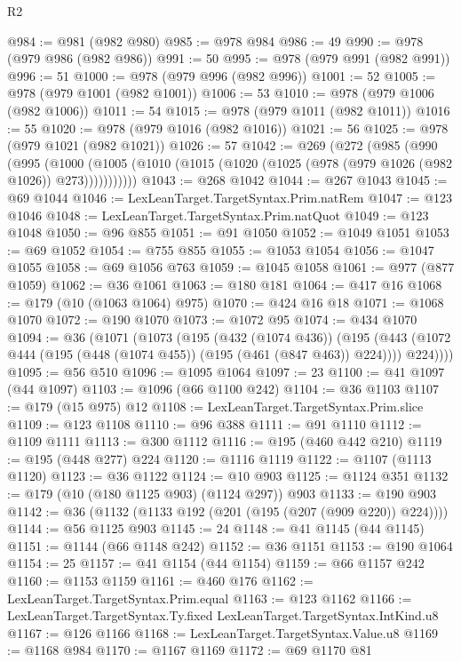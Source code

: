 \begin{lexlean}{R2}
\begin{coremodule}
{{{{{{{{{{{{{{{{{{{{{{{{{{{{{{{{{{{{{{{{{{{{{{@984 := @981 (@982 @980)
@985 := @978 @984
@986 := 49
@990 := @978 (@979 @986 (@982 @986))
@991 := 50
@995 := @978 (@979 @991 (@982 @991))
@996 := 51
@1000 := @978 (@979 @996 (@982 @996))
@1001 := 52
@1005 := @978 (@979 @1001 (@982 @1001))
@1006 := 53
@1010 := @978 (@979 @1006 (@982 @1006))
@1011 := 54
@1015 := @978 (@979 @1011 (@982 @1011))
@1016 := 55
@1020 := @978 (@979 @1016 (@982 @1016))
@1021 := 56
@1025 := @978 (@979 @1021 (@982 @1021))
@1026 := 57
@1042 := @269
    (@272
      (@985
        (@990
          (@995
            (@1000
              (@1005 (@1010 (@1015 (@1020 (@1025 (@978 (@979 @1026 (@982 @1026)) @273)))))))))))
@1043 := @268 @1042
@1044 := @267 @1043
@1045 := @69 @1044
@1046 := LexLeanTarget.TargetSyntax.Prim.natRem
@1047 := @123 @1046
@1048 := LexLeanTarget.TargetSyntax.Prim.natQuot
@1049 := @123 @1048
@1050 := @96 @855
@1051 := @91 @1050
@1052 := @1049 @1051
@1053 := @69 @1052
@1054 := @755 @855
@1055 := @1053 @1054
@1056 := @1047 @1055
@1058 := @69 @1056 @763
@1059 := @1045 @1058
@1061 := @977 (@877 @1059)
@1062 := @36 @1061
@1063 := @180 @181
@1064 := @417 @16
@1068 := @179 (@10 (@1063 @1064) @975)
@1070 := @424 @16 @18
@1071 := @1068 @1070
@1072 := @190 @1070
@1073 := @1072 @95
@1074 := @434 @1070
@1094 := @36
    (@1071
      (@1073
        (@195
          (@432 (@1074 @436))
          (@195
            (@443 (@1072 @444 (@195 (@448 (@1074 @455)) (@195 (@461 (@847 @463)) @224))))
            @224))))
@1095 := @56 @510
@1096 := @1095 @1064
@1097 := 23
@1100 := @41 @1097 (@44 @1097)
@1103 := @1096 (@66 @1100 @242)
@1104 := @36 @1103
@1107 := @179 (@15 @975) @12
@1108 := LexLeanTarget.TargetSyntax.Prim.slice
@1109 := @123 @1108
@1110 := @96 @388
@1111 := @91 @1110
@1112 := @1109 @1111
@1113 := @300 @1112
@1116 := @195 (@460 @442 @210)
@1119 := @195 (@448 @277) @224
@1120 := @1116 @1119
@1122 := @1107 (@1113 @1120)
@1123 := @36 @1122
@1124 := @10 @903
@1125 := @1124 @351
@1132 := @179 (@10 (@180 @1125 @903) (@1124 @297)) @903
@1133 := @190 @903
@1142 := @36 (@1132 (@1133 @192 (@201 (@195 (@207 (@909 @220)) @224))))
@1144 := @56 @1125 @903
@1145 := 24
@1148 := @41 @1145 (@44 @1145)
@1151 := @1144 (@66 @1148 @242)
@1152 := @36 @1151
@1153 := @190 @1064
@1154 := 25
@1157 := @41 @1154 (@44 @1154)
@1159 := @66 @1157 @242
@1160 := @1153 @1159
@1161 := @460 @176
@1162 := LexLeanTarget.TargetSyntax.Prim.equal
@1163 := @123 @1162
@1166 := LexLeanTarget.TargetSyntax.Ty.fixed LexLeanTarget.TargetSyntax.IntKind.u8
@1167 := @126 @1166
@1168 := LexLeanTarget.TargetSyntax.Value.u8
@1169 := @1168 @984
@1170 := @1167 @1169
@1172 := @69 @1170 @81
}}}}}}}}}}}}}}}}}}}}}}}}}}}}}}}}}}}}}}}}}}}}}}
\end{coremodule}
\end{lexlean}
